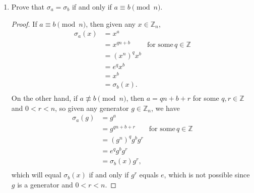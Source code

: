 \documentclass{article}
\begin{document}
\begin{enumerate}
\begin{enumerate}
\begin{enumerate}
          \item Prove that $\sigma_a=\sigma_b$ if and only if $a\equiv b
            \pmod{n}$. \label{qn:inj}
            \begin{proof}
              If $a\equiv b\pmod{n}$, then given any $x\in\mathbb{Z}_n$,
              \begin{align*}
                \sigma_a(x) &= x^a          & \\
                            &= x^{qn+b}     & \text{for some}\, q\in\mathbb{Z} \\
                            &= (x^n)^qx^b   & \\
                            &= e^qx^b       & \\
                            &= x^b          & \\
                            &= \sigma_b(x). & \\
              \end{align*}
              On the other hand, if $a\not\equiv b\pmod{n}$, then
              $a=qn+b+r$ for some $q,r\in\mathbb{Z}$ and $0<r<n$, so given
              any generator $g\in\mathbb{Z}_n$, we have
              \begin{align*}
                \sigma_a(g) &= g^a          & \\
                            &= g^{qn+b+r}   & \text{for some}\, q\in\mathbb{Z} \\
                            &= (g^n)^qg^bg^r& \\
                            &= e^qg^bg^r    & \\
                            &= \sigma_b(x)g^r, & \\
              \end{align*}
              which will equal $\sigma_b(x)$ if and only if $g^r$ equals
              $e$, which is not possible since $g$ is a generator and
              $0<r<n$.
            \end{proof}


\end{enumerate}
\end{enumerate}
\end{enumerate}
\end{document}
